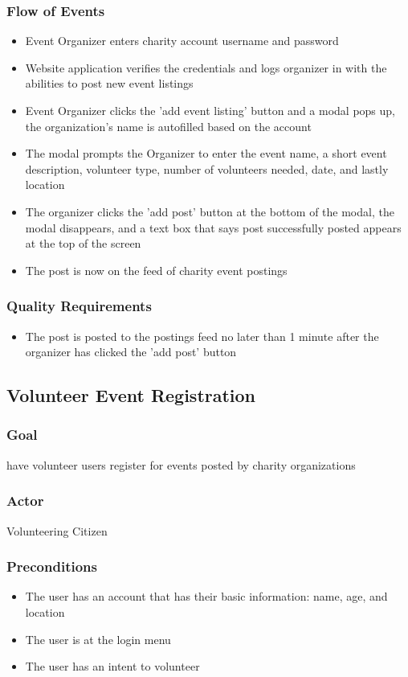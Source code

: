 \documentclass[12pt]{article}
\begin{document}
\subsubsection{Flow of Events}
\begin{itemize}
\item
	Event Organizer enters charity account username and password
\item
	Website application verifies the credentials and logs organizer in with the
	abilities to post new event listings
\item
	Event Organizer clicks the 'add event listing' button and a modal pops up, the
	organization's name is autofilled based on the account
\item
	The modal prompts the Organizer to enter the event name, a short event
	description, volunteer type, number of volunteers needed, date, and lastly
	location
\item
	The organizer clicks the 'add post' button at the bottom of the modal, the modal
	disappears, and a text box that says post successfully posted appears at the top
	of the screen
\item
	The post is now on the feed of charity event postings
\end{itemize}
\subsubsection{Quality Requirements}
\begin{itemize}
\item
	The post is posted to the postings feed no later than 1 minute after the organizer
	has clicked the 'add post' button
\end{itemize}
\subsection{Volunteer Event Registration}
\subsubsection{Goal}
have volunteer users register for events posted by charity organizations
\subsubsection{Actor}
Volunteering Citizen
\subsubsection{Preconditions}
\begin{itemize}
\item
	The user has an account that has their basic information: name, age, and location
\item
	The user is at the login menu
\item
	The user has an intent to volunteer
\end{itemize}
\end{document}
